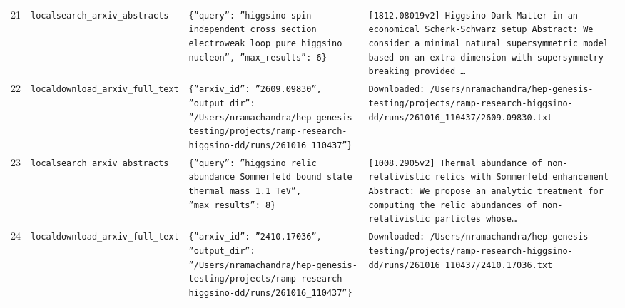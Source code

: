 \documentclass[11pt,a4paper]{article}
\begin{document}
\begin{longtable}{@{}p{}p{}p{}p{}@{}}
21 & \texttt{local}\newline\texttt{search\_\allowbreak{}arxiv\_\allowbreak{}abstracts} & \texttt{\{''query'':\allowbreak{} ''higgsino spin-independent cross section electroweak loop pure higgsino nucleon'',\allowbreak{} ''max\_\allowbreak{}results'':\allowbreak{} 6\}\allowbreak{}} & \texttt{[1812.08019v2]\allowbreak{} Higgsino Dark Matter in an economical Scherk-Schwarz setup Abstract:\allowbreak{} We consider a minimal natural supersymmetric model based on an extra dimension with supersymmetry breaking provided \ldots{}\allowbreak{}} \\
22 & \texttt{local}\newline\texttt{download\_\allowbreak{}arxiv\_\allowbreak{}full\_\allowbreak{}text} & \texttt{\{''arxiv\_\allowbreak{}id'':\allowbreak{} ''2609.09830'',\allowbreak{} ''output\_\allowbreak{}dir'':\allowbreak{} ''/\allowbreak{}Users/\allowbreak{}nramachandra/\allowbreak{}hep-genesis-testing/\allowbreak{}projects/\allowbreak{}ramp-research-higgsino-dd/\allowbreak{}runs/\allowbreak{}261016\_\allowbreak{}110437''\}\allowbreak{}} & \texttt{Downloaded:\allowbreak{} /\allowbreak{}Users/\allowbreak{}nramachandra/\allowbreak{}hep-genesis-testing/\allowbreak{}projects/\allowbreak{}ramp-research-higgsino-dd/\allowbreak{}runs/\allowbreak{}261016\_\allowbreak{}110437/\allowbreak{}2609.09830.txt} \\
23 & \texttt{local}\newline\texttt{search\_\allowbreak{}arxiv\_\allowbreak{}abstracts} & \texttt{\{''query'':\allowbreak{} ''higgsino relic abundance Sommerfeld bound state thermal mass 1.1 TeV'',\allowbreak{} ''max\_\allowbreak{}results'':\allowbreak{} 8\}\allowbreak{}} & \texttt{[1008.2905v2]\allowbreak{} Thermal abundance of non-relativistic relics with Sommerfeld enhancement Abstract:\allowbreak{} We propose an analytic treatment for computing the relic abundances of non-relativistic particles whose\ldots{}\allowbreak{}} \\
24 & \texttt{local}\newline\texttt{download\_\allowbreak{}arxiv\_\allowbreak{}full\_\allowbreak{}text} & \texttt{\{''arxiv\_\allowbreak{}id'':\allowbreak{} ''2410.17036'',\allowbreak{} ''output\_\allowbreak{}dir'':\allowbreak{} ''/\allowbreak{}Users/\allowbreak{}nramachandra/\allowbreak{}hep-genesis-testing/\allowbreak{}projects/\allowbreak{}ramp-research-higgsino-dd/\allowbreak{}runs/\allowbreak{}261016\_\allowbreak{}110437''\}\allowbreak{}} & \texttt{Downloaded:\allowbreak{} /\allowbreak{}Users/\allowbreak{}nramachandra/\allowbreak{}hep-genesis-testing/\allowbreak{}projects/\allowbreak{}ramp-research-higgsino-dd/\allowbreak{}runs/\allowbreak{}261016\_\allowbreak{}110437/\allowbreak{}2410.17036.txt} \\

\end{longtable}
\end{document}
